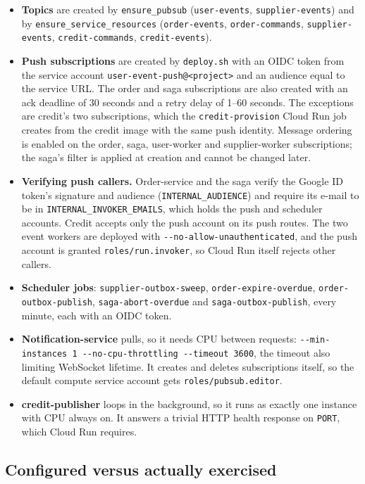 \documentclass[11pt,a4paper]{article}
\newcommand{\code}[1]{\nolinkurl{#1}}
\begin{document}
\begin{itemize}
  \item \textbf{Topics} are created by \code{ensure_pubsub} (\code{user-events},
  \code{supplier-events}) and by \code{ensure_service_resources} (\code{order-events},
  \code{order-commands}, \code{supplier-events}, \code{credit-commands},
  \code{credit-events}).
  \item \textbf{Push subscriptions} are created by \code{deploy.sh} with an OIDC token
  from the service account \code{user-event-push@<project>} and an audience equal to the
  service URL. The order and saga subscriptions are also created with an ack deadline of
  30 seconds and a retry delay of 1--60 seconds. The exceptions are credit's two
  subscriptions, which the \code{credit-provision} Cloud Run
  job creates from the credit image with the same push identity. Message ordering is
  enabled on the order, saga, user-worker and supplier-worker subscriptions; the saga's
  filter is applied at creation and cannot be changed later.
  \item \textbf{Verifying push callers.} Order-service and the saga verify the Google ID
  token's signature and audience (\code{INTERNAL_AUDIENCE}) and require its e-mail to be
  in \code{INTERNAL_INVOKER_EMAILS}, which holds the push and scheduler accounts. Credit
  accepts only the push account on its push routes. The two event workers are deployed
  with \code{--no-allow-unauthenticated}, and the push account is granted
  \code{roles/run.invoker}, so Cloud Run itself rejects other callers.
  \item \textbf{Scheduler jobs}: \code{supplier-outbox-sweep},
  \code{order-expire-overdue}, \code{order-outbox-publish}, \code{saga-abort-overdue} and
  \code{saga-outbox-publish}, every minute, each with an OIDC token.
  \item \textbf{Notification-service} pulls, so it needs CPU between requests:
  \code{--min-instances 1 --no-cpu-throttling --timeout 3600}, the timeout also limiting
  WebSocket lifetime. It creates and deletes subscriptions itself, so the default compute
  service account gets \code{roles/pubsub.editor}.
  \item \textbf{credit-publisher} loops in the background, so it runs as exactly one
  instance with CPU always on. It answers a trivial HTTP health response on
  \code{PORT}, which Cloud Run requires.
\end{itemize}

\subsection{Configured versus actually exercised}
\end{document}
